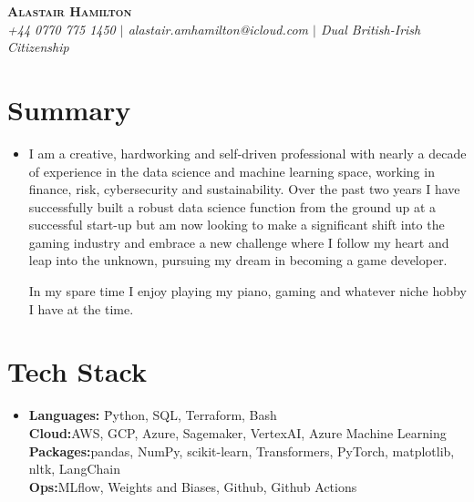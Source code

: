 \documentclass[letterpaper,11pt]{article}
\begin{document}
\vspace{-5pt}

\begin{center}
    \textbf{\Huge \scshape Alastair Hamilton} \\
    \textit{\small +44 0770 775 1450 $|$ alastair.amhamilton@icloud.com $|$ Dual British-Irish Citizenship}
    \vspace{8pt} 
\end{center}

\section{Summary}
\begin{itemize}[leftmargin=0.2in, label={}]
    \item 
        \begin{minipage}[t]{1.0\linewidth}
            I am a creative, hardworking and self-driven professional with
            nearly a decade of experience in the data science and machine
            learning space, working in finance, risk, cybersecurity and
            sustainability. Over the past two years I have successfully
            built a robust data science function from the ground up at a
            successful start-up but am now looking to make a significant
            shift into the gaming industry and embrace a new challenge where
            I follow my heart and leap into the unknown, pursuing my dream in
            becoming a game developer.

            In my spare time I enjoy playing my piano, gaming and whatever 
            niche hobby I have at the time.
        \end{minipage}
\end{itemize}

\section{Tech Stack}
\begin{itemize}[leftmargin=0.2in, label={}]
    \item 
        \begin{minipage}[t]{1.0\linewidth}
            \begin{tabbing}
            \textbf{Languages:}  \=Python, SQL, Terraform, Bash \\
            \textbf{Cloud:}\>AWS, GCP, Azure, Sagemaker, VertexAI, 
            Azure Machine Learning \\
            \textbf{Packages:}\>pandas, NumPy, scikit-learn, Transformers,
            PyTorch, matplotlib, nltk, LangChain \\
            \textbf{Ops:}\>MLflow, Weights and Biases, Github, 
            Github Actions
            \end{tabbing} 
        \end{minipage}
\end{itemize}
\end{document}
